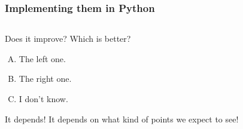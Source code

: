 \begin{frame}
	\frametitle{Implementing them in Python}
		\vspace{-10pt}
	\begin{columns}
			
		\pause
		
	\end{columns}
	\pause
		\vspace{-10pt}
	\begin{questionblock}{Does it improve?}
		Which is better?	
		\vspace{-10pt}
		\begin{multicols}{3}
		\begin{enumerate}[A.]
			\item The left one.
			\item The right one.
			\item I don't know.
		\end{enumerate}
	\end{multicols}
	\end{questionblock}
	\pause
		\vspace{-8pt}
		\begin{answerblock}{It depends!}
			It depends on what kind of points we expect to see!
		\end{answerblock}
\end{frame}
